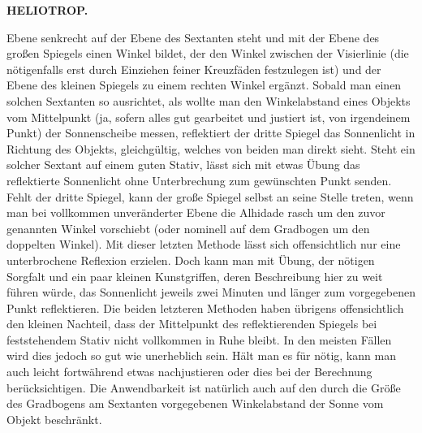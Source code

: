\par\clearpage
\noindent\null\hfill{\small\textbf{HELIOTROP.}}\hfill{}\par\medskip
\noindent Ebene senkrecht auf der Ebene des Sextanten steht und mit der Ebene des großen Spiegels einen Winkel bildet, der den Winkel zwischen der Visierlinie (die nötigenfalls erst durch Einziehen feiner Kreuzfäden festzulegen ist) und der Ebene des kleinen Spiegels zu einem rechten Winkel ergänzt. Sobald man einen solchen Sextanten so ausrichtet, als wollte man den Winkelabstand eines Objekts vom Mittelpunkt (ja, sofern alles gut gearbeitet und justiert ist, von irgendeinem Punkt) der Sonnenscheibe messen, reflektiert der dritte Spiegel das Sonnenlicht in Richtung des Objekts, gleichgültig, welches von beiden man direkt sieht. Steht ein solcher Sextant auf einem guten Stativ, lässt sich mit etwas Übung das reflektierte Sonnenlicht ohne Unterbrechung zum gewünschten Punkt senden. Fehlt der dritte Spiegel, kann der große Spiegel selbst an seine Stelle treten, wenn man bei vollkommen unveränderter Ebene die Alhidade rasch um den zuvor genannten Winkel vorschiebt (oder nominell auf dem Gradbogen um den doppelten Winkel). Mit dieser letzten Methode lässt sich offensichtlich nur eine unterbrochene Reflexion erzielen. Doch kann man mit Übung, der nötigen Sorgfalt und ein paar kleinen Kunstgriffen, deren Beschreibung hier zu weit führen würde, das Sonnenlicht jeweils zwei Minuten und länger zum vorgegebenen Punkt reflektieren. Die beiden letzteren Methoden haben übrigens offensichtlich den kleinen Nachteil, dass der Mittelpunkt des reflektierenden Spiegels bei feststehendem Stativ nicht vollkommen in Ruhe bleibt. In den meisten Fällen wird dies jedoch so gut wie unerheblich sein. Hält man es für nötig, kann man auch leicht fortwährend etwas nachjustieren oder dies bei der Berechnung berücksichtigen. Die Anwendbarkeit ist natürlich auch auf den durch die Größe des Gradbogens am Sextanten vorgegebenen Winkelabstand der Sonne vom Objekt beschränkt.

